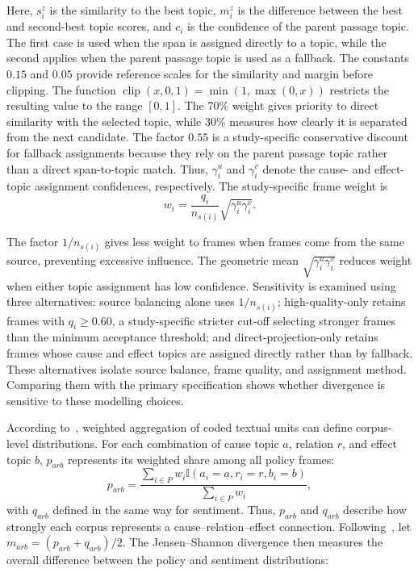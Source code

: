 Here, $s_i^{z}$ is the similarity to the best topic, $m_i^{z}$ is the
difference between the best and second-best topic scores, and $c_i$ is the
confidence of the parent passage topic. The first case is used when the span
is assigned directly to a topic, while the second applies when the parent
passage topic is used as a fallback. The constants $0.15$ and $0.05$
provide reference scales for the similarity and margin before clipping.
The function
$\operatorname{clip}(x,0,1)=\min(1,\max(0,x))$ restricts the resulting value
to the range $[0,1]$.
The 70\% weight gives priority to direct similarity with the selected topic,
while 30\% measures how clearly it is separated from the next candidate.
The factor $0.55$ is a study-specific conservative discount for fallback
assignments because they rely on the parent passage topic rather than a direct
span-to-topic match. Thus, $\gamma_i^{u}$ and $\gamma_i^{v}$ denote the
cause- and effect-topic assignment confidences, respectively.
The study-specific frame weight is
\begin{equation}
w_i
=
\frac{q_i}{n_{s(i)}}
\sqrt{\gamma_i^{u}\gamma_i^{v}}.
\label{eq:method-frame-weight}
\end{equation}

The factor $1/n_{s(i)}$ gives less weight to frames when
frames come from the same source, preventing excessive influence. The geometric
mean $\sqrt{\gamma_i^{u}\gamma_i^{v}}$ reduces weight when either topic assignment
has low confidence. Sensitivity is examined using three alternatives: source
balancing alone uses $1/n_{s(i)}$; high-quality-only retains frames with
$q_i\geq0.60$, a study-specific stricter cut-off selecting stronger frames than
the minimum acceptance threshold; and direct-projection-only retains frames whose
cause and effect topics are assigned directly rather than by fallback. These
alternatives isolate source balance, frame quality, and assignment method.
Comparing them with the primary specification shows whether divergence is
sensitive to these modelling choices.

According to~\cite{gentzkow2019text,grimmer2013text}, weighted aggregation of
coded textual units can define corpus-level distributions. For each
combination of cause topic $a$, relation $r$, and effect topic $b$,
$p_{arb}$ represents its weighted share among all policy frames:
\begin{equation}
p_{arb}
=
\frac{
\sum_{i\in P}
w_i\mathbb{I}(a_i=a,r_i=r,b_i=b)
}{
\sum_{i\in P}w_i
},
\label{eq:method-policy-frame-distribution}
\end{equation}
with $q_{arb}$ defined in the same way for sentiment. Thus, $p_{arb}$ and $q_{arb}$
describe how strongly each corpus represents a cause--relation--effect connection.
Following~\cite{lin1991divergence}, let $m_{arb}=(p_{arb}+q_{arb})/2$. The
Jensen--Shannon divergence then measures the overall difference between the policy
and sentiment distributions:

